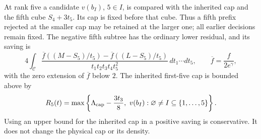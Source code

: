 At rank five a candidate $v(b_I)$, $5\in I$, is compared with the
inherited cap and the fifth cube $S_4+3t_5$.  Its cap is fixed before
that cube.  Thus a fifth prefix rejected at the smaller cap may be
retained at the larger one; all earlier decisions remain fixed.
The negative fifth subtree has the ordinary lower residual, and its
saving is
\begin{equation}\label{sv:odd-gain}
 4\int_{\mathcal C}
 \frac{\overline f((M-S_5)/t_5)
                   -\overline f((L-S_5)/t_5)}
      {t_1t_2t_3t_4t_5^2}\,dt_1\cdots dt_5,
 \qquad \overline f=\frac{f}{2e^\gamma},
\end{equation}
with the zero extension of $\overline f$ below $2$.
The inherited first-five cap is bounded above by
\begin{equation}\label{sv:fifth-envelope}
 R_5(t)=\max\left\{\Lambda_{\rm cap}-\frac{3t_3}{8},\
         v(b_I):\varnothing\ne I\subseteq\{1,\ldots,5\}\right\}.
\end{equation}
Using an upper bound for the inherited cap in a positive saving is
conservative.  It does not change the physical cap or its density.

